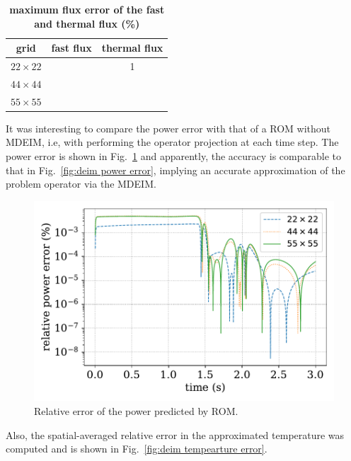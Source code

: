 \documentclass[]{interact}
\theoremstyle{plain}%
\theoremstyle{definition}
\theoremstyle{remark}
\begin{document}
\begin{table}[H]
	\centering
	\begin{tabular}{c|c|c}  
		grid &	fast flux  &  thermal flux \\
		\hline
		$22\times 22$ &    &  1     \\
		$44\times 44$ &    &       \\
		$55\times 55$ &    &       \\
		\hline
	\end{tabular}
	\caption{\bf maximum flux error of the fast and thermal flux (\%)}
	\label{tab:lra flux errors}
\end{table}
It was interesting to compare the power error with that of a ROM without MDEIM, i.e, with performing the operator projection at each time step.
The power error is shown in Fig.~\ref{fig:rom power error} and apparently, the accuracy is comparable to that in Fig.~\ref{fig:deim power error}, implying an accurate approximation of the problem operator via the MDEIM. 
\begin{figure}[H]
	\includegraphics[width=1.0\linewidth]{../figures/LRA_power_rom_relative_error.pdf}
	\caption{Relative error of the power predicted by ROM.}
	\label{fig:rom power error}
\end{figure}
Also, the spatial-averaged relative error in the approximated temperature was computed and is shown in Fig.~\ref{fig:deim tempearture error}.
\end{document}

